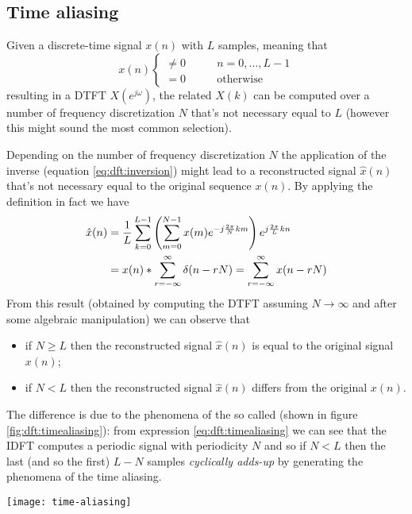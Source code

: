 	\subsection{Time aliasing}
		Given a discrete-time signal $x(n)$ with $L$ samples, meaning that
		\[ x(n)  \begin{cases}
			\neq 0 \qquad & n = 0,\dots, L-1 \\ = 0 & \textrm{otherwise}
		\end{cases} \]
		resulting  in a DTFT $X(e^{j\omega})$, the related \dft $X(k)$ can  be computed over a number of frequency discretization $N$ that's not necessary equal to $L$ (however this might sound the most common selection).
		
		Depending on the number of frequency discretization $N$ the application of the inverse \dft (equation \ref{eq:dft:inversion}) might lead to a reconstructed signal $\hat x(n)$ that's not necessary equal to the original sequence $x(n)$. By applying the definition in fact we have
		\begin{equation} \label{eq:dft:timealiasing}
		\begin{aligned}
			\hat x(n) & = \frac 1 L \sum_{k=0}^{L-1} \left( \sum_{m=0}^{N-1} x(m) e^{-j \frac{2\pi}{N}km} \right) e^{j\frac{2\pi}{L} kn} \\
			& = x(n) * \sum_{r=-\infty}^\infty \delta(n-rN) = \sum_{r=-\infty}^\infty x(n-rN)
		\end{aligned}
		\end{equation}
		From this result (obtained by computing the DTFT assuming $N\rightarrow \infty$ and after some algebraic manipulation) we can observe that
		\begin{itemize}
			\item if $N\geq L$ then the reconstructed signal $\hat x(n)$ is equal to the original signal $x(n)$;
			\item if $N < L$ then the reconstructed signal $\hat x(n)$ differs from the original $x(n)$.
		\end{itemize}
		
		The difference is due to the phenomena of the so called  (shown in figure \ref{fig:dft:timealiasing}): from expression \ref{eq:dft:timealiasing} we can see that the IDFT computes a periodic signal with periodicity $N$ and so if $N < L$ then the last (and so the first) $L-N$ samples \textit{cyclically adds-up} by generating the phenomena of the time aliasing.		
		
		\begin{SCfigure}[2][bht]
			\centering \texttt{[image: time-aliasing]}
			\caption{ on top: original sequence $x(n)$ consisting of $L=9$ samples; below DFT+IDFT computed on $N = 12 (>L)$ and $N = 7(< L)$ samples; in the second case we can observe the phenomena of the time aliasing. } \label{fig:dft:timealiasing}
		\end{SCfigure}
		
